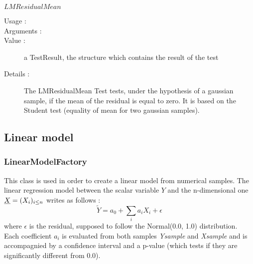 \begin{description}
\begin{description}
  \item $LMResidualMean$
    \begin{description}
    \item[Usage :] \rule{0pt}{1em}
    \item[Arguments :] \rule{0pt}{1em}
    \item[Value :]  a TestResult, the structure which contains the result of the test
    \item[Details :]        The LMResidualMean Test  tests, under the hypothesis of a gaussian sample, if the mean of the residual is equal to zero. It is based on the Student test (equality of mean for two gaussian samples).
    \end{description}

  \end{description}

\end{description}





\newpage \subsection{Linear model} \label{linearModelConstruction}

\subsubsection{LinearModelFactory}

This class is used in order to create a linear model from numerical samples.
The linear regression model between the scalar variable $Y$ and the n-dimensional one ${\underline{X}} = (X_i)_{i \leq n}$ writes as follows :
$$
\tilde{Y} = a_0 + \sum_i a_i X_i + \epsilon
$$
where $\epsilon$ is the residual, supposed to follow the Normal(0.0, 1.0) distribution.\\
Each coefficient $a_i$ is evaluated from both samples {\itshape Ysample} and {\itshape Xsample} and is accompagnied by a confidence interval and a p-value (which tests if they are significantly different from 0.0).\\

